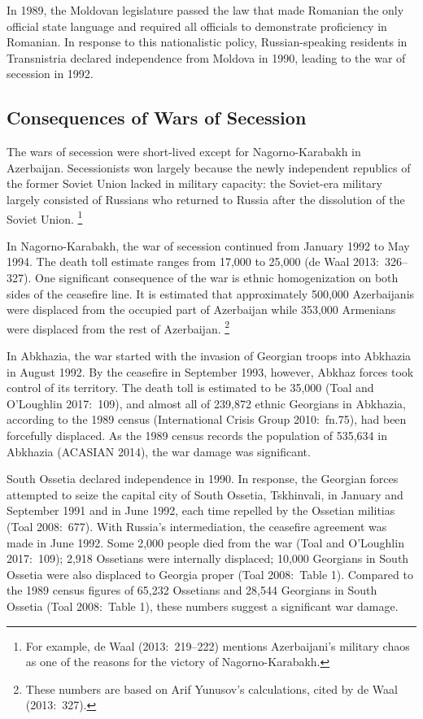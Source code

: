 \documentclass[12pt,a4paper]{article}%
\begin{document}
In 1989, the Moldovan legislature passed the law that made Romanian the only official state language and required all officials to demonstrate proficiency in Romanian. 
In response to this nationalistic policy, Russian-speaking residents in Transnistria declared independence from Moldova in 1990, leading to the war of secession in 1992.%
\subsection{Consequences of Wars of Secession}
The wars of secession were short-lived except for Nagorno-Karabakh in Azerbaijan. 
Secessionists won largely because the newly independent republics of the former Soviet Union lacked in military capacity: the Soviet-era military largely consisted of Russians who returned to Russia after the dissolution of the Soviet Union.%
\footnote{
	For example, de Waal (2013:\ 219--222) mentions Azerbaijani's military chaos as one of the reasons for the victory of Nagorno-Karabakh.
}

In Nagorno-Karabakh, the war of secession continued from January 1992 to May 1994. The death toll estimate ranges from 17,000 to 25,000 (de Waal 2013:\ 326--327). One significant consequence of the war is ethnic homogenization on both sides of the ceasefire line. 
It is estimated that approximately 500,000 Azerbaijanis were displaced from the occupied part of Azerbaijan while 353,000 Armenians were displaced from the rest of Azerbaijan.%
\footnote{
	These numbers are based on Arif Yunusov's calculations, cited by de Waal (2013:\ 327).
}

In Abkhazia, the war started with the invasion of Georgian troops into Abkhazia in August 1992. 
By the ceasefire in September 1993, however, Abkhaz forces took control of its territory.
The death toll is estimated to be 35,000 (Toal and O'Loughlin 2017:\ 109), and almost all of 239,872 ethnic Georgians in Abkhazia, according to the 1989 census (International Crisis Group 2010:\ fn.75), had been forcefully displaced. 
As the 1989 census records the population of 535,634 in Abkhazia (ACASIAN 2014), the war damage was significant.

South Ossetia declared independence in 1990. 
In response, the Georgian forces attempted to seize the capital city of South Ossetia, Tskhinvali, in January and September 1991 and in June 1992, each time repelled by the Ossetian militias (Toal 2008:\ 677).
With Russia's intermediation, the ceasefire agreement was made in June 1992.
Some 2,000 people died from the war (Toal and O'Loughlin 2017:\ 109); 2,918 Ossetians were internally displaced; 10,000 Georgians in South Ossetia were also displaced to Georgia proper (Toal 2008:\ Table 1). 
Compared to the 1989 census figures of 65,232 Ossetians and 28,544 Georgians in South Ossetia (Toal 2008:\ Table 1), these numbers suggest a significant war damage.
\end{document}
